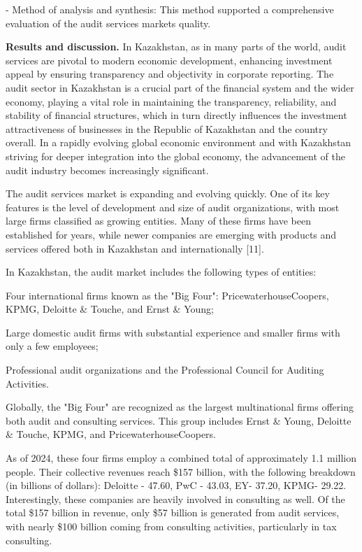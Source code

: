 - Method of analysis and synthesis: This method supported a
comprehensive evaluation of the audit services market\textquotesingle s
quality.

\textbf{Results and discussion.} In Kazakhstan, as in many parts of the
world, audit services are pivotal to modern economic development,
enhancing investment appeal by ensuring transparency and objectivity in
corporate reporting. The audit sector in Kazakhstan is a crucial part of
the financial system and the wider economy, playing a vital role in
maintaining the transparency, reliability, and stability of financial
structures, which in turn directly influences the investment
attractiveness of businesses in the Republic of Kazakhstan and the
country overall. In a rapidly evolving global economic environment and
with Kazakhstan striving for deeper integration into the global economy,
the advancement of the audit industry becomes increasingly significant.

The audit services market is expanding and evolving quickly. One of its
key features is the level of development and size of audit
organizations, with most large firms classified as growing entities.
Many of these firms have been established for years, while newer
companies are emerging with products and services offered both in
Kazakhstan and internationally {[}11{]}.

In Kazakhstan, the audit market includes the following types of
entities:

Four international firms known as the "Big Four":
PricewaterhouseCoopers, KPMG, Deloitte \& Touche, and Ernst \& Young;

Large domestic audit firms with substantial experience and smaller firms
with only a few employees;

Professional audit organizations and the Professional Council for
Auditing Activities.

Globally, the "Big Four" are recognized as the largest multinational
firms offering both audit and consulting services. This group includes
Ernst \& Young, Deloitte \& Touche, KPMG, and PricewaterhouseCoopers.

As of 2024, these four firms employ a combined total of approximately
1.1 million people. Their collective revenues reach \$157 billion, with
the following breakdown (in billions of dollars): Deloitte - 47.60, PwC
- 43.03, EY- 37.20, KPMG- 29.22. Interestingly, these companies are
heavily involved in consulting as well. Of the total \$157 billion in
revenue, only \$57 billion is generated from audit services, with nearly
\$100 billion coming from consulting activities, particularly in tax
consulting.

